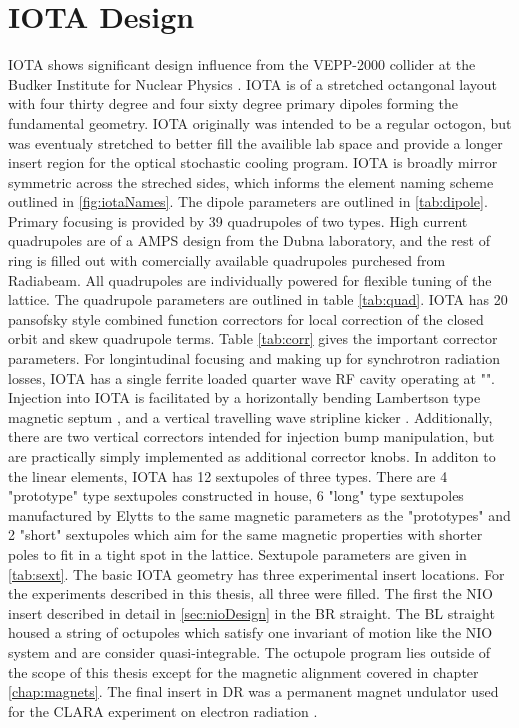\section{IOTA Design}
IOTA shows significant design influence from the VEPP-2000 collider at the Budker Institute for Nuclear Physics \cite{vepp-2000}. IOTA is of a stretched octangonal layout with four thirty degree and four sixty degree primary dipoles forming the fundamental geometry. IOTA originally was intended to be a regular octogon, but was eventualy stretched to better fill the availible lab space and provide a longer insert region for the optical stochastic cooling program. IOTA is broadly mirror symmetric across the streched sides, which informs the element naming scheme outlined in \ref{fig:iotaNames}. The dipole parameters are outlined in \ref{tab:dipole}. Primary focusing is provided by 39 quadrupoles of two types. High current quadrupoles are of a AMPS design from the Dubna laboratory, and the rest of ring is filled out with comercially available quadrupoles purchesed from Radiabeam. All quadrupoles are individually powered for flexible tuning of the lattice. The quadrupole parameters are outlined in table \ref{tab:quad}. IOTA has 20 pansofsky \cite{panofsky} style combined function correctors for local correction of the closed orbit and skew quadrupole terms. Table \ref{tab:corr} gives the important corrector parameters. For longintudinal focusing and making up for synchrotron radiation losses, IOTA has a single ferrite loaded quarter wave RF cavity operating at "". Injection into IOTA is facilitated by a horizontally bending Lambertson type magnetic septum \cite{lambertsonPatent???}, and a vertical travelling wave stripline kicker \cite{antipovKicker}. Additionally, there are two vertical correctors intended for injection bump manipulation, but are practically simply implemented as additional corrector knobs. In additon to the linear elements, IOTA has 12 sextupoles of three types. There are 4 "prototype" type sextupoles constructed in house, 6 "long" type sextupoles manufactured by Elytts to the same magnetic parameters as the "prototypes" and 2 "short" sextupoles which aim for the same magnetic properties with shorter poles to fit in a tight spot in the lattice. Sextupole parameters are given in \ref{tab:sext}. The basic IOTA geometry has three experimental insert locations. For the experiments described in this thesis, all three were filled. The first the NIO insert described in detail in \ref{sec:nioDesign} in the BR straight. The BL straight housed a string of octupoles which satisfy one invariant of motion like the NIO system and are consider quasi-integrable. The octupole program lies outside of the scope of this thesis except for the magnetic alignment covered in chapter \ref{chap:magnets}. The final insert in DR was a permanent magnet undulator used for the CLARA experiment on electron radiation \cite{clara}. 

